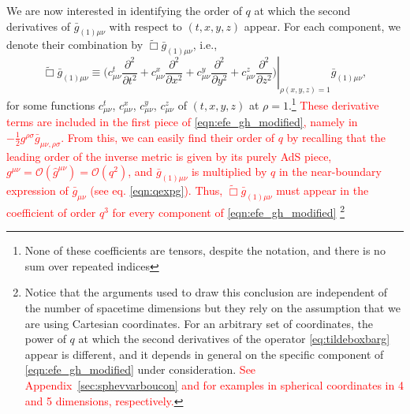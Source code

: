 \documentclass[a4paper,11pt]{article}
\numberwithin{equation}{section}
\begin{document}
We are now interested in identifying the order of $q$ at which the second derivatives of $ \bar{g}_{(1) \mu \nu}$ with respect to $(t,x,y,z)$ 
appear.
For each component, we denote their combination by $\tilde{\Box}\bar{g}_{(1)\mu\nu}$, i.e., 
\begin{equation}
\label{eq:tildeboxbarg}
\tilde{\Box}\bar{g}_{(1)\mu\nu}\equiv\left.\biggl(c^t_{\mu\nu}\frac{\partial^2}{\partial t^2}+c^x_{\mu\nu}\frac{\partial^2}{\partial x^2}+c^y_{\mu\nu}\frac{\partial^2}{\partial y^2}+c^z_{\mu\nu}\frac{\partial^2}{\partial z^2}\biggr)\right |_{\rho(x,y,z)=1}\bar{g}_{(1)\mu\nu},
\end{equation}
for some functions $c^t_{\mu\nu}$, $c^x_{\mu\nu}$, $c^y_{\mu\nu}$, $c^z_{\mu\nu}$ of $(t,x,y,z)$ at $\rho=1$.\footnote{None of these coefficients are tensors, despite the notation, and there is no sum over repeated indices}
\textcolor{red}{These derivative terms are included in the first piece of \eqref{eqn:efe_gh_modified}, namely in $-\frac{1}{2}g^{\rho \sigma} \bar{g}_{\mu \nu, \rho \sigma}$. From this, we can easily find their order of $q$ by recalling that the leading order of the inverse metric is given by its purely AdS piece, $g^{\mu\nu}=\mathcal{O}(\hat{g}^{\mu\nu})=\mathcal{O}(q^{2})$, and $\bar{g}_{(1)\mu\nu}$ is multiplied by $q$ in the near-boundary expression of $\bar{g}_{\mu\nu}$ (see  eq. \eqref{eqn:qexpg}). Thus, $\tilde{\Box}\bar{g}_{(1)\mu\nu}$ must appear in the coefficient of order $q^{3}$ for every component of \eqref{eqn:efe_gh_modified}}
\footnote{Notice that the arguments used to draw this conclusion are independent of the number of spacetime dimensions but they rely on the assumption that we are using Cartesian coordinates. For an arbitrary set of coordinates, the power of $q$ at which the second derivatives of the operator \eqref{eq:tildeboxbarg} appear is different, and it depends in general on the specific component of \eqref{eqn:efe_gh_modified} under consideration.
\textcolor{red}{See Appendix~\ref{sec:sphevvarboucon} and \cite{Bantilan:2012vu} for examples in spherical coordinates in 4 and 5 dimensions, respectively.}
}
\end{document}
